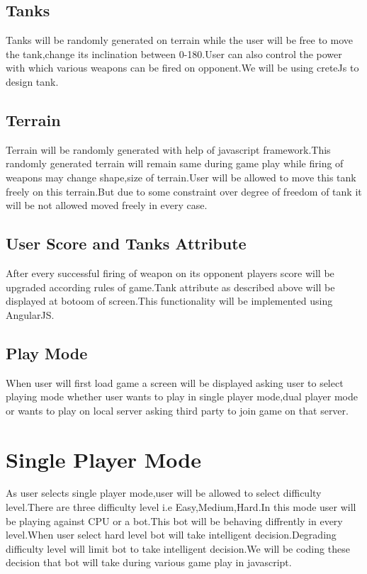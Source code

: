 \documentclass{scrreprt}
\begin{document}
\subsection{Tanks}
Tanks will be randomly generated on terrain while the user will be free to move the tank,change its inclination between 0-180.User can also control the power with which various weapons can be fired on opponent.We will be using creteJs to design tank.\\
\subsection{Terrain}
Terrain will be randomly generated with help of javascript framework.This randomly generated terrain will remain same during game play while firing of weapons may change shape,size of terrain.User will be allowed to move this tank freely on this terrain.But due to some constraint over degree of freedom of tank it will be not allowed moved freely in every case.\\
\subsection{User Score and Tanks Attribute}
After every successful firing of weapon on its opponent players score will be upgraded according rules of game.Tank attribute as described above will be displayed at botoom of screen.This functionality will be implemented using AngularJS.
\subsection{Play Mode}
When user will first load game a screen will be displayed asking user to select playing mode whether user wants to play in single player mode,dual player mode or wants to play on local server asking third party to join game on that server.\\

\section{Single Player Mode}
As user selects single player mode,user will be allowed to select difficulty level.There are three difficulty level i.e Easy,Medium,Hard.In this mode user will be playing against CPU or a bot.This bot will be behaving diffrently in every level.When user select hard level bot will take intelligent decision.Degrading difficulty level will limit bot to take intelligent decision.We will be coding these decision that bot will take during various game play in javascript.\\
\end{document}
